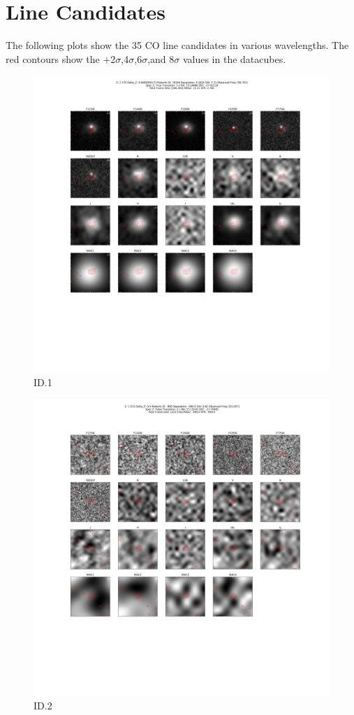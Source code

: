 \section{Line Candidates}\label{sec:A1}

The following plots show the 35 CO line candidates in various wavelengths. The red contours show the  +2$\sigma$,4$\sigma$,6$\sigma$,and 8$\sigma$ values in the datacubes. 

\begin{figure}[tbp]
\centering \includegraphics[width=120mm]{Matched/ASPECS_Cutout_0.png}
\caption{ID.1}
\label{fig:Match_One}
\end{figure}

\begin{figure}[tbp]
\centering \includegraphics[width=120mm]{Matched/ASPECS_Cutout_1.png}
\caption{ID.2}
\label{fig:Match_Two}
\end{figure}

